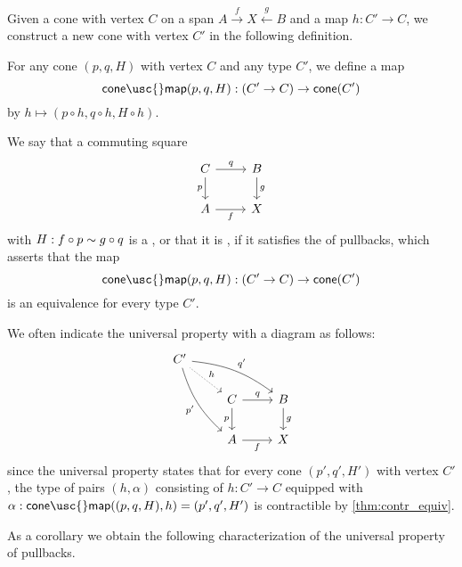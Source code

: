 Given a cone with vertex $C$ on a span $A\stackrel{f}{\rightarrow} X \stackrel{g}{\leftarrow} B$ and a map $h:C'\to C$, we construct a new cone with vertex $C'$ in the following definition.

\begin{defn}
For any cone $(p,q,H)$ with vertex $C$ and any type $C'$, we define a map
\begin{equation*}
\mathsf{cone\usc{}map}(p,q,H):(C'\to C)\to\mathsf{cone}(C')
\end{equation*}
by $h\mapsto (p\circ h,q\circ h,H\circ h)$. 
\end{defn}

\begin{defn}
We say that a commuting square
\begin{equation*}
\begin{tikzcd}
C \arrow[r,"q"] \arrow[d,swap,"p"] & B \arrow[d,"g"] \\
A \arrow[r,swap,"f"] & X
\end{tikzcd}
\end{equation*}
with $H:f\circ p\sim g\circ q$ is a , or that it is , if it satisfies the  of pullbacks, which asserts that the map
\begin{equation*}
\mathsf{cone\usc{}map}(p,q,H):(C'\to C)\to\mathsf{cone}(C')
\end{equation*}
is an equivalence for every type $C'$. 
\end{defn}

We often indicate the universal property with a diagram as follows:
\begin{equation*}
\begin{tikzcd}
C' \arrow[drr,bend left=15,"{q'}"] \arrow[dr,densely dotted,"h"] \arrow[ddr,bend right=15,swap,"{p'}"] \\
& C \arrow[r,"q"] \arrow[d,swap,"p"] & B \arrow[d,"g"] \\
& A \arrow[r,swap,"f"] & X
\end{tikzcd}
\end{equation*}
since the universal property states that for every cone $(p',q',H')$ with vertex $C'$, the type of pairs $(h,\alpha)$ consisting of $h:C'\to C$ equipped with $\alpha:\mathsf{cone\usc{}map}((p,q,H),h)=(p',q',H')$ is contractible by \cref{thm:contr_equiv}.

As a corollary we obtain the following characterization of the universal property of pullbacks.

